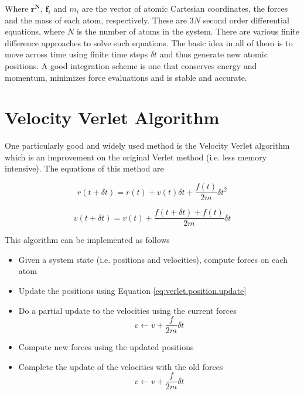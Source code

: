 \documentclass[aip,jcp,preprint,superscriptaddress,floatfix]{revtex4-1}
\begin{document}
Where $\mathbf{r^N}$, $\mathbf{f}_i$ and
 $\textit{m}_i$ are the vector of atomic Cartesian coordinates, the forces 
 and the mass of each atom, respectively.
These are $3N$ second order differential equations, where $N$ is the number 
of atoms in the system. There are various finite difference approaches to solve
such equations. The basic idea in all of them is to move 
across time using finite time steps $\delta t$ and thus generate new atomic
positions. A good integration scheme is one that conserves energy 
and momentum, minimizes force evaluations and is stable and accurate. 

\section{Velocity Verlet Algorithm}

One particularly good and widely used method is the Velocity Verlet algorithm
which is an improvement on the original Verlet method (i.e. less memory
intensive). The equations of this method are

\begin{equation}
	r \left( t + \delta t \right) = r \left( t \right) + v \left( t \right) \delta t + \frac{f \left(t \right) }{2 m} \delta t ^2
\label{eq:verlet.position.update}
\end{equation}

\begin{equation}
	v \left( t + \delta t \right) = v \left( t \right) + \frac{f \left( t + \delta t \right) + f \left(t \right) }{2m} \delta t
\end{equation}

This algorithm can be implemented as follows

\begin{itemize}
	\item Given a system state (i.e. positions and velocities), 
		compute forces on each atom
	\item Update the positions using Equation \ref{eq:verlet.position.update}
	\item Do a partial update to the velocities using the current forces
		\begin{equation}
			v \leftarrow v + \frac{f}{2m} \delta t
		\end{equation}
	\item Compute new forces using the updated positions
	\item Complete the update of the velocities with the old forces
		\begin{equation}
			v \leftarrow v + \frac{f}{2m} \delta t
		\end{equation}

\end{itemize}
\end{document}

